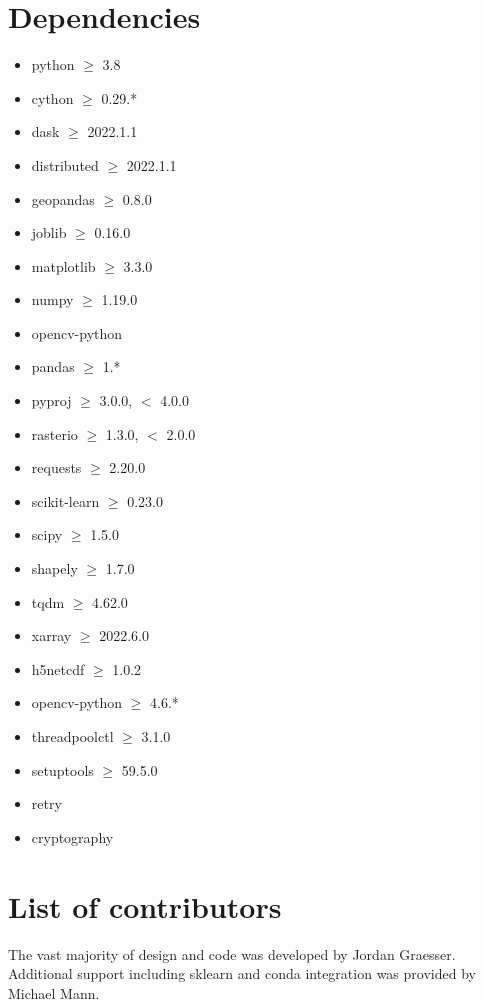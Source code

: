\documentclass{jors}
\begin{document}
\section*{Dependencies}
\begin{itemize}
\item python  $\ge$ 3.8
\item cython  $\ge$ 0.29.*
\item dask  $\ge$ 2022.1.1
\item distributed  $\ge$ 2022.1.1
\item geopandas  $\ge$ 0.8.0
\item joblib  $\ge$ 0.16.0
\item matplotlib  $\ge$ 3.3.0
\item numpy  $\ge$ 1.19.0
\item opencv-python   
\item pandas  $\ge$ 1.*
\item pyproj  $\ge$ 3.0.0, $<$ 4.0.0
\item rasterio  $\ge$ 1.3.0, $<$ 2.0.0
\item requests  $\ge$ 2.20.0
\item scikit-learn  $\ge$ 0.23.0
\item scipy  $\ge$ 1.5.0
\item shapely  $\ge$ 1.7.0
\item tqdm  $\ge$ 4.62.0
\item xarray  $\ge$ 2022.6.0
\item h5netcdf $\ge$ 1.0.2
\item opencv-python $\ge$ 4.6.*
\item threadpoolctl $\ge$ 3.1.0
\item setuptools  $\ge$ 59.5.0
\item retry   
\item cryptography
\end{itemize}

    

\section*{List of contributors}
The vast majority of design and code was developed by Jordan Graesser. Additional support including sklearn and conda integration was provided by Michael Mann. 
\end{document}
